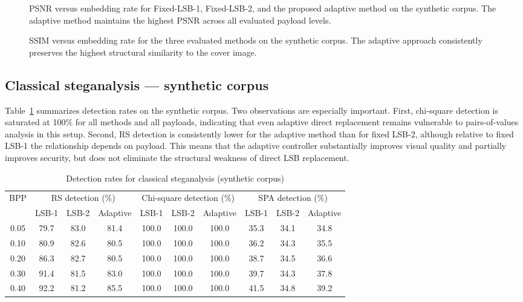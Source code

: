 \begin{figure}[H]
    \centering
    \caption{PSNR versus embedding rate for Fixed-LSB-1, Fixed-LSB-2, and the proposed adaptive method on the synthetic corpus. The adaptive method maintains the highest PSNR across all evaluated payload levels.}
    \label{fig:psnr_bpp}
\end{figure}

\begin{figure}[H]
    \centering
    \caption{SSIM versus embedding rate for the three evaluated methods on the synthetic corpus. The adaptive approach consistently preserves the highest structural similarity to the cover image.}
    \label{fig:ssim_bpp}
\end{figure}

\subsection{Classical steganalysis --- synthetic corpus}
Table~\ref{tab:detectors} summarizes detection rates on the synthetic corpus. Two observations are especially important. First, chi-square detection is saturated at 100\% for all methods and all payloads, indicating that even adaptive direct replacement remains vulnerable to pairs-of-values analysis in this setup. Second, RS detection is consistently lower for the adaptive method than for fixed LSB-2, although relative to fixed LSB-1 the relationship depends on payload. This means that the adaptive controller substantially improves visual quality and partially improves security, but does not eliminate the structural weakness of direct LSB replacement.

\begin{table}[H]
\centering
\caption{Detection rates for classical steganalysis (synthetic corpus)}
\label{tab:detectors}
\begin{adjustbox}{max width=\textwidth}
\begin{tabular}{cccccccccc}
\toprule
\multirow{2}{*}{BPP} & \multicolumn{3}{c}{RS detection (\%)} & \multicolumn{3}{c}{Chi-square detection (\%)} & \multicolumn{3}{c}{SPA detection (\%)} \\
\cmidrule(lr){2-4} \cmidrule(lr){5-7} \cmidrule(lr){8-10}
& LSB-1 & LSB-2 & Adaptive & LSB-1 & LSB-2 & Adaptive & LSB-1 & LSB-2 & Adaptive \\
\midrule
0.05 & 79.7 & 83.0 & 81.4 & 100.0 & 100.0 & 100.0 & 35.3 & 34.1 & 34.8 \\
0.10 & 80.9 & 82.6 & 80.5 & 100.0 & 100.0 & 100.0 & 36.2 & 34.3 & 35.5 \\
0.20 & 86.3 & 82.7 & 80.5 & 100.0 & 100.0 & 100.0 & 38.7 & 34.5 & 36.6 \\
0.30 & 91.4 & 81.5 & 83.0 & 100.0 & 100.0 & 100.0 & 39.7 & 34.3 & 37.8 \\
0.40 & 92.2 & 81.2 & 85.5 & 100.0 & 100.0 & 100.0 & 41.5 & 34.8 & 39.2 \\
\bottomrule
\end{tabular}
\end{adjustbox}
\end{table}


